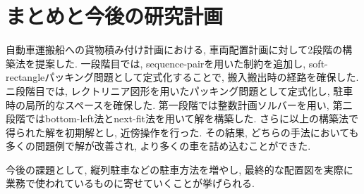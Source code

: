 \chapter{まとめと今後の研究計画}\label{conclution}
自動車運搬船への貨物積み付け計画における, 車両配置計画に対して2段階の構築法を提案した. 
一段階目では, sequence-pairを用いた制約を追加し, soft-rectangleパッキング問題として定式化することで, 搬入搬出時の経路を確保した.  
ニ段階目では, レクトリニア図形を用いたパッキング問題として定式化し, 駐車時の局所的なスペースを確保した. 
第一段階では整数計画ソルバーを用い, 第二段階ではbottom-left法とnext-fit法を用いて解を構築した. 
さらに以上の構築法で得られた解を初期解とし, 近傍操作を行った. 
その結果, どちらの手法においても多くの問題例で解が改善され, より多くの車を詰め込むことができた. 

今後の課題として, 縦列駐車などの駐車方法を増やし, 最終的な配置図を実際に業務で使われているものに寄せていくことが挙げられる. 
